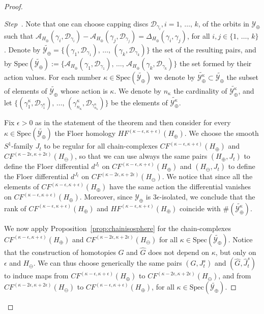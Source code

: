 \documentclass[AHL,Unicode,longabstracts,published]{cedram}
\newcommand{\Spec}{\mathrm{Spec}}
\newcommand{\clY}{\mathcal{Y}}
\newcommand{\clA}{\mathcal{A}}
\newcommand{\clD}{\mathcal{D}}
\newcounter{stepcount}
\newenvironment{step}{\refstepcounter{stepcount}\begin{proof}[Step~\thestepcount]}{\let\qed\relax\end{proof}}
\begin{document}
\begin{proof}
\setcounter{stepcount}{0}
\begin{step}\label{step1.1}
Note that one can choose capping discs $\clD_{\gamma_i}, i=1, \,\ldots,\,k$, of the orbits in $\clY_{\oplus}$ such that $\clA_{H_\oplus}(\gamma_i, \clD_{\gamma_i}) - \clA_{H_\oplus}(\gamma_j, \clD_{\gamma_j}) = \Delta_{H_{\oplus}}(\gamma_i,\gamma_j)$, for all $i,j \in \{1, \,\ldots,\,k\}$. Denote by $\widetilde{\clY_{\oplus}} = \{(\gamma_1, \clD_{\gamma_1}),\,\ldots,\,(\gamma_k, \clD_{\gamma_k})\}$ the set of the resulting pairs, and by $\Spec(\widetilde{\clY_\oplus}):= \{ \clA_{H_\oplus}(\gamma_1, \clD_{\gamma_1}),\,\ldots,\,\clA_{H_\oplus}(\gamma_k, \clD_{\gamma_k})\} $ the set formed by their action values. For each number $\kappa \in \Spec(\widetilde{\clY_\oplus})$ we denote by $\widetilde{\clY^\kappa_\oplus} \subset \widetilde{\clY_\oplus}$ the subset of elements of $\widetilde{\clY_\oplus}$ whose action is $\kappa$. We denote by $n_\kappa$ the cardinality of $\widetilde{\clY^\kappa_\oplus} $, and let $\{(\gamma^\kappa_1,\clD_{\gamma^\kappa_1}),\,\ldots,\,(\gamma^\kappa_{n_\kappa},\clD_{\gamma^\kappa_{n_\kappa}})\}$ be the elements of $\widetilde{\clY^\kappa_\oplus} $.

Fix $\epsilon>0$ as in the statement of the theorem and then consider for every $\kappa \in \Spec(\widetilde{\clY_\oplus})$ the Floer homology $HF^{(\kappa - \epsilon, \kappa+ \epsilon)}(H_\oplus)$. We choose the smooth $S^1$-family $J_t$ to be regular for all chain-complexes $CF^{(\kappa - \epsilon, \kappa+ \epsilon)}(H_\oplus)$ and $CF^{(\kappa - 2\epsilon, \kappa+ 2\epsilon)}(H_\ominus)$, so that we can use always the same pairs $(H_\oplus,J_t)$ to define the Floer differential $d^{J_t}$ on $CF^{(\kappa - \epsilon, \kappa+ \epsilon)}(H_\oplus)$ and $(H_\ominus,J_t)$ to define the Floer differential $d^{J_t}$ on $CF^{(\kappa - 2\epsilon, \kappa+ 2\epsilon)}(H_\ominus)$. We notice that since all the elements of $CF^{(\kappa - \epsilon, \kappa+ \epsilon)}(H_\oplus)$ have the same action the differential vanishes on $CF^{(\kappa - \epsilon, \kappa+ \epsilon)}(H_\oplus)$. Moreover, since $\clY_\oplus$ is $3\epsilon$-isolated, we conclude that the rank of $CF^{(\kappa - \epsilon, \kappa+ \epsilon)}(H_\oplus)$ and $HF^{(\kappa - \epsilon, \kappa+ \epsilon)}(H_\oplus)$ coincide with $\# (\widetilde{\clY^\kappa_\oplus})$.

We now apply Proposition~\ref{prop:chainisosphere} for the chain-complexes $CF^{(\kappa - \epsilon, \kappa+ \epsilon)}(H_\oplus)$ and \linebreak $CF^{(\kappa - 2\epsilon, \kappa+ 2\epsilon)}(H_\ominus)$ for all $\kappa \in \Spec(\widetilde{\clY_\oplus})$. Notice that the construction of homotopies $G$ and $\widehat{G}$ does not depend on $\kappa$, but only on $\epsilon$ and $H_\ominus$. We can thus choose generically the same pairs $(G,J^s_t)$ and $(\widehat{G},\widehat{J}^s_t)$ to induce maps from $CF^{(\kappa - \epsilon, \kappa+ \epsilon)}(H_\oplus)$ to $CF^{(\kappa - 2\epsilon, \kappa+ 2\epsilon)}(H_\ominus)$, and from $CF^{(\kappa - 2\epsilon, \kappa+ 2\epsilon)}(H_\ominus)$ to $CF^{(\kappa - \epsilon, \kappa+ \epsilon)}(H_\oplus)$, for all $\kappa \in \Spec(\widetilde{\clY_\oplus})$.


\end{step}
\end{proof}
\end{document}
